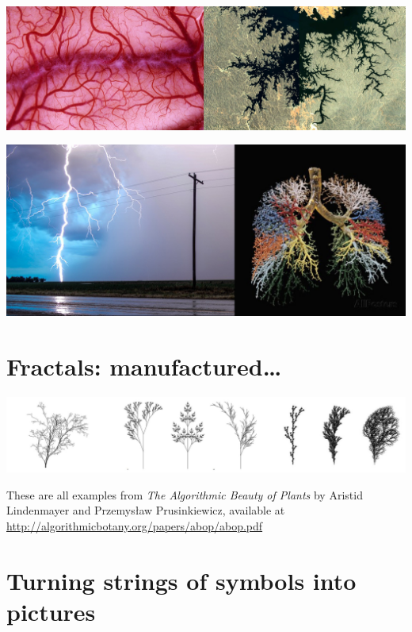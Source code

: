 \documentclass[bigger]{beamer}
\begin{document}
\begin{center}
\includegraphics[width=.9\linewidth]{./out1.jpg}
\end{center}
\begin{center}
\includegraphics[width=.9\linewidth]{./out2.jpg}
\end{center}

\section*{Fractals: manufactured\ldots{}}
\label{sec:orgddda475}
\begin{center}
\includegraphics[width=.9\linewidth]{./agop.jpg}
\end{center}

These are all examples from \emph{The Algorithmic Beauty of Plants} by 
Aristid Lindenmayer and Przemysław Prusinkiewicz, available at 
\url{http://algorithmicbotany.org/papers/abop/abop.pdf}

\section*{Turning strings of symbols into pictures}
\label{sec:org2810c9d}
\end{document}
